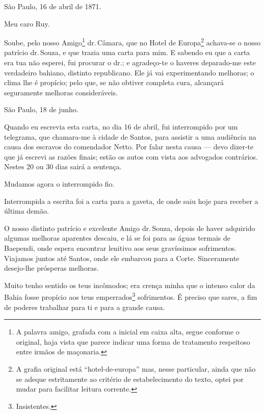 São Paulo, 16 de abril de 1871.

Meu caro Ruy.

Soube, pelo nosso Amigo\footnote{ A palavra amigo, grafada com a
  inicial em caixa alta, segue conforme o original, haja vista que
  parece indicar uma forma de tratamento respeitoso entre irmãos de
  maçonaria.} dr.\,Câmara, que no Hotel de Europa\footnote{ A grafia
  original está ``hotel-de-europa'' mas, nesse particular, ainda que não
  se adeque estritamente ao critério de estabelecimento do texto, optei
  por mudar para facilitar leitura corrente.} achava-se o nosso patrício
dr.\,Souza, e que trazia uma carta para mim. E sabendo eu que a carta era
tua não esperei, fui procurar o dr.; e agradeço-te o haveres deparado-me
este verdadeiro bahiano, distinto republicano. Ele já vai experimentando
melhoras; o clima lhe é propício; pelo que, se não obtiver completa
cura, alcançará seguramente melhoras consideráveis.

São Paulo, 18 de junho.

Quando eu escrevia esta carta, no dia 16 de abril, fui interrompido por
um telegrama, que chamara-me à cidade de Santos, para assistir a uma
audiência na causa dos escravos do comendador Netto. Por falar nesta
causa --- devo dizer-te que já escrevi as razões finais; estão os autos
com vista aos advogados contrários. Nestes 20 ou 30 dias sairá a
sentença.

Mudamos agora o interrompido fio.

Interrompida a escrita foi a carta {para a gaveta}, de onde saiu hoje
para receber a última demão.

O nosso distinto patrício e excelente Amigo dr.\,Souza, depois de haver
adquirido algumas melhoras aparentes descaiu, e lá se foi para as águas
termais de Baependi, onde espera encontrar lenitivo aos seus gravíssimos
sofrimentos. Viajamos juntos até Santos, onde ele embarcou para a Corte.
Sinceramente desejo-lhe prósperas melhoras.

Muito tenho sentido os teus incômodos; era crença minha que o intenso
calor da Bahia fosse propício aos teus emperrados\footnote{
  Insistentes.} sofrimentos. É preciso que sares, a fim de poderes
trabalhar para ti e para a grande causa.

